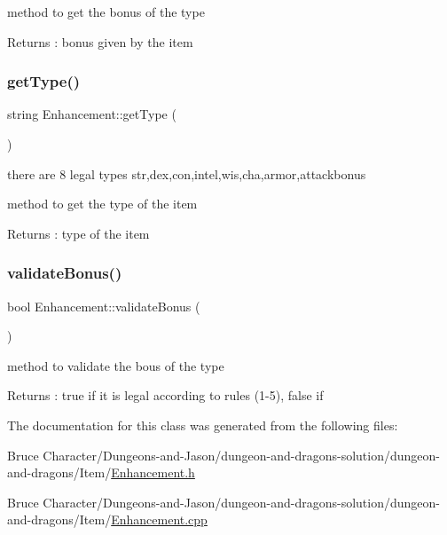 method to get the bonus of the type \begin{DoxyReturn}{Returns}
\+: bonus given by the item 
\end{DoxyReturn}
\hypertarget{class_enhancement_abcdde9da0542f751301f4ddf1809a1cc}{}\label{class_enhancement_abcdde9da0542f751301f4ddf1809a1cc} 
\subsubsection{\texorpdfstring{get\+Type()}{getType()}}
{\footnotesize\ttfamily string Enhancement\+::get\+Type (\begin{DoxyParamCaption}{ }\end{DoxyParamCaption})}



there are 8 legal types str,dex,con,intel,wis,cha,armor,attackbonus 

method to get the type of the item \begin{DoxyReturn}{Returns}
\+: type of the item 
\end{DoxyReturn}
\hypertarget{class_enhancement_a00877c4e776f45566020b3129bcaf477}{}\label{class_enhancement_a00877c4e776f45566020b3129bcaf477} 
\subsubsection{\texorpdfstring{validate\+Bonus()}{validateBonus()}}
{\footnotesize\ttfamily bool Enhancement\+::validate\+Bonus (\begin{DoxyParamCaption}{ }\end{DoxyParamCaption})}

method to validate the bous of the type \begin{DoxyReturn}{Returns}
\+: true if it is legal according to rules (1-\/5), false if 
\end{DoxyReturn}


The documentation for this class was generated from the following files\+:\begin{DoxyCompactItemize}
\item 
Bruce Character/\+Dungeons-\/and-\/\+Jason/dungeon-\/and-\/dragons-\/solution/dungeon-\/and-\/dragons/\+Item/\hyperlink{_enhancement_8h}{Enhancement.\+h}\item 
Bruce Character/\+Dungeons-\/and-\/\+Jason/dungeon-\/and-\/dragons-\/solution/dungeon-\/and-\/dragons/\+Item/\hyperlink{_enhancement_8cpp}{Enhancement.\+cpp}\end{DoxyCompactItemize}
